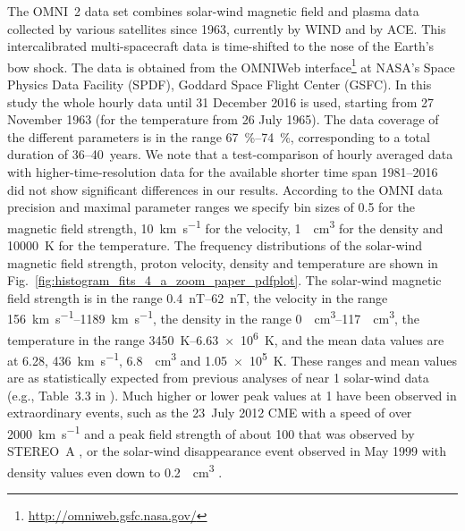 \documentclass[]{aa}
\begin{document}
        The OMNI~2 data set \citep{King2005} combines solar-wind magnetic field and plasma data collected by various satellites since 1963, currently by WIND and by ACE. This intercalibrated multi-spacecraft data is time-shifted to the nose of the Earth’s bow shock. The data is obtained from the OMNIWeb interface\footnote{\url{http://omniweb.gsfc.nasa.gov/}} at NASA's Space Physics Data Facility (SPDF), Goddard Space Flight Center (GSFC).
        In this study the whole hourly data until 31 December 2016 is used, starting from 27 November 1963 (for the temperature from 26 July 1965). The data coverage of the different parameters is in the range \SIrange{67}{74}{\percent},  corresponding to a total duration of 36--40~years.
        We note that a test-comparison of hourly averaged data with higher-time-resolution data for the available shorter time span 1981--2016 did not show significant differences in our results.
        According to the OMNI data precision and maximal parameter ranges we specify bin sizes of \SI{0.5}{\nT} for the magnetic field strength, \SI{10}{\km\per\s} for the velocity, \SI{1}{\per\cm\cubed} for the density and \SI{10000}{\K} for the temperature. The frequency distributions of the solar-wind magnetic field strength, proton velocity, density and temperature are shown in Fig.~\ref{fig:histogram_fits_4_a_zoom_paper_pdfplot}.
        The solar-wind magnetic field strength is in the range \SIrange{0.4}{62}{nT}, the velocity in the range \SIrange{156}{1189}{\km\per\s}, the density in the range \SIrange{0}{117}{\per\cm\cubed}, the temperature in the range \SIrange{3450}{6.63e6}{\K}, and the mean data values are at \SI{6.28}{\nT}, \SI{436}{\km\per\s}, \SI{6.8}{\per\cm\cubed} and \SI{1.05e5}{\K}. These ranges and mean values are as statistically expected from previous analyses of near \SI{1}{\au} solar-wind data (e.g., Table~3.3 in \citet[p.~39]{Bothmer2007}).
        Much higher or lower peak values at \SI{1}{\au} have been observed in extraordinary events, such as the 23~July 2012 CME with a speed of over \SI{2000}{\km\per\s} and a peak field strength of about \SI{100}{\nT} that was observed by STEREO~A \citep{Russell2013}, or the solar-wind disappearance event observed in May 1999 with density values even down to \SI{0.2}{\per\cm\cubed} \citep{Lazarus2000}.
\end{document}
